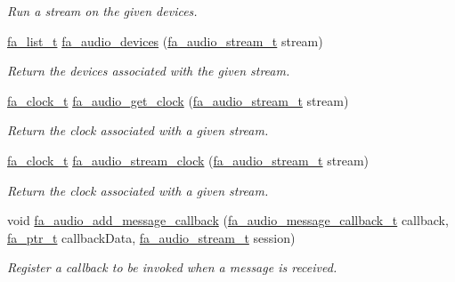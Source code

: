 \begin{DoxyCompactItemize}
\begin{DoxyCompactList}\small\item\em Run a stream on the given devices. \end{DoxyCompactList}\item 
\hyperlink{group___fa_list_ga35ecb12ab934ded0cce0bcf28e3bc5d2}{fa\-\_\-list\-\_\-t} \hyperlink{group___fa_audio_stream_gac4e606b56619fb93da2ad08a29124b99}{fa\-\_\-audio\-\_\-devices} (\hyperlink{group___fa_audio_stream_ga78fbee3026130ce00d8e00a4e73a84c3}{fa\-\_\-audio\-\_\-stream\-\_\-t} stream)
\begin{DoxyCompactList}\small\item\em Return the devices associated with the given stream. \end{DoxyCompactList}\item 
\hyperlink{group___fa_clock_ga20b3a0f49788fbedba140b1d315d2313}{fa\-\_\-clock\-\_\-t} \hyperlink{group___fa_audio_stream_gafeddb7f975954c8d586af0d3a7043f93}{fa\-\_\-audio\-\_\-get\-\_\-clock} (\hyperlink{group___fa_audio_stream_ga78fbee3026130ce00d8e00a4e73a84c3}{fa\-\_\-audio\-\_\-stream\-\_\-t} stream)
\begin{DoxyCompactList}\small\item\em Return the clock associated with a given stream. \end{DoxyCompactList}\item 
\hyperlink{group___fa_clock_ga20b3a0f49788fbedba140b1d315d2313}{fa\-\_\-clock\-\_\-t} \hyperlink{group___fa_audio_stream_ga4d3c49d217cb3e8cebea323261997840}{fa\-\_\-audio\-\_\-stream\-\_\-clock} (\hyperlink{group___fa_audio_stream_ga78fbee3026130ce00d8e00a4e73a84c3}{fa\-\_\-audio\-\_\-stream\-\_\-t} stream)
\begin{DoxyCompactList}\small\item\em Return the clock associated with a given stream. \end{DoxyCompactList}\item 
void \hyperlink{group___fa_audio_stream_gace71cd35b253e3891f1742667fd1be68}{fa\-\_\-audio\-\_\-add\-\_\-message\-\_\-callback} (\hyperlink{group___fa_audio_stream_gaee8c48d438acabf22f2dfa3b85a4196c}{fa\-\_\-audio\-\_\-message\-\_\-callback\-\_\-t} callback, \hyperlink{group___fa_ga915ddeae99ad7568b273d2b876425197}{fa\-\_\-ptr\-\_\-t} callback\-Data, \hyperlink{group___fa_audio_stream_ga78fbee3026130ce00d8e00a4e73a84c3}{fa\-\_\-audio\-\_\-stream\-\_\-t} session)
\begin{DoxyCompactList}\small\item\em Register a callback to be invoked when a message is received. \end{DoxyCompactList}\item 

\end{DoxyCompactItemize}
